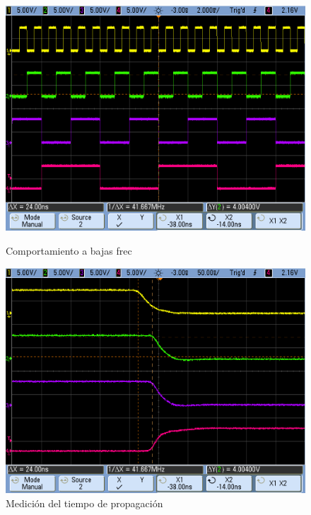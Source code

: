 \begin{figure}[H]
\begin{center}
  \begin{minipage}[b]{0.4\textwidth}
  	\begin{center}
  		\includegraphics[scale=0.2]{ejercicio7/imagenes/sync25.png}
  	\end{center}
  \caption{Comportamiento a bajas frec}
  \label{7_fig8}
  \end{minipage}
  \begin{minipage}[b]{0.4\textwidth}
  	\begin{center}
  		\includegraphics[scale=0.2]{ejercicio7/imagenes/sync24.png}
  	\end{center}
  \caption{Medición del tiempo de propagación}
  \label{7_fig9}
  \end{minipage}
\end{center}
\end{figure}
